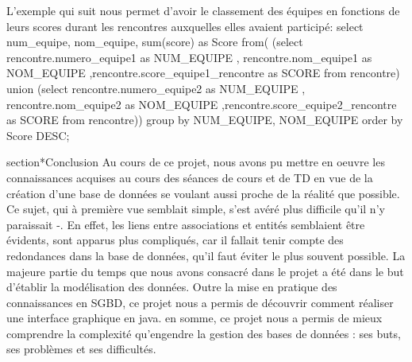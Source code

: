 L'exemple qui suit nous permet d'avoir le classement des équipes en fonctions de leurs scores durant les rencontres auxquelles elles avaient participé:
select num_equipe, nom_equipe, sum(score) as Score
from(
(select rencontre.numero_equipe1 as NUM_EQUIPE , rencontre.nom_equipe1 as NOM_EQUIPE ,rencontre.score_equipe1_rencontre as SCORE
from rencontre)
union
(select rencontre.numero_equipe2 as NUM_EQUIPE , rencontre.nom_equipe2 as NOM_EQUIPE ,rencontre.score_equipe2_rencontre as SCORE
from rencontre))
group by NUM_EQUIPE, NOM_EQUIPE
order by Score DESC;


section*{Conclusion}
Au cours de ce projet, nous avons pu mettre en oeuvre les connaissances acquises au cours des séances de cours et de TD en vue de la création d'une base de données se voulant aussi proche de la réalité que possible.
Ce sujet, qui à première vue semblait simple, s'est avéré plus difficile qu'il n'y paraissait -. En effet, les liens entre associations et entités semblaient être évidents, sont apparus plus compliqués, car il fallait tenir compte des redondances dans la base de données, qu'il faut éviter le plus souvent possible.
La majeure partie du temps que nous avons consacré dans le projet a été dans le but d'établir la modélisation des données.
Outre la mise en pratique des connaissances en SGBD, ce projet nous a permis de découvrir comment réaliser une interface graphique en java.
en somme, ce projet nous a permis de mieux comprendre la complexité qu'engendre la gestion des bases de données : ses buts, ses problèmes et ses difficultés. 